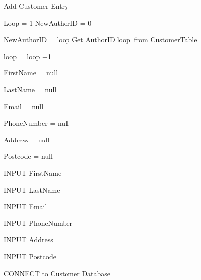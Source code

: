 \begin{algorithm}[H]
    \caption{Add Customer Entry}
\begin{algorithmic}[1]

Loop = 1
NewAuthorID = 0


    NewAuthorID = loop
    Get AuthorID[loop] from CustomerTable


        loop = loop +1

    \Else


    \EndIf
\EndWhile

FirstName = null

LastName = null

Email = null

PhoneNumber = null

Address = null

Postcode = null


    INPUT FirstName

\EndWhile


    INPUT LastName

\EndWhile


    INPUT Email

\EndWhile


    INPUT PhoneNumber

\EndWhile


    INPUT Address

\EndWhile


    INPUT Postcode

\EndWhile


    CONNECT to Customer Database

\EndIf
\EndFunction
\end{algorithmic}
\end{algorithm}

